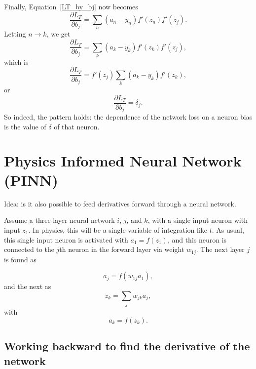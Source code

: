 \documentclass[12pt]{article}
\begin{document}
Finally, Equation~\ref{LT_by_bj} now becomes
\begin{equation}
\frac{\partial L_T}{\partial b_j}=\sum_n (a_n-y_n)f'(z_n)f'(z_j).
\end{equation}
Letting $n\rightarrow k$, we get
\begin{equation}
\frac{\partial L_T}{\partial b_j}=\sum_k (a_k-y_k)f'(z_k)f'(z_j),
\end{equation}
which is 
\begin{equation}
\frac{\partial L_T}{\partial b_j}=f'(z_j)\sum_k (a_k-y_k)f'(z_k),
\end{equation}
or 
\begin{equation}
\frac{\partial L_T}{\partial b_j}=\delta_j.
\end{equation}
So indeed, the pattern holds: the dependence of the network loss on a neuron bias is the value of $\delta$ of that  neuron. 


\section{Physics Informed Neural Network (PINN)}

Idea: is it also possible to feed derivatives forward through a neural network.

Assume a three-layer neural network $i$, $j$, and $k$, with a single input neuron with input $z_1$. In physics, this will be a single variable of integration like $t$. As usual, this single input neuron is activated with $a_1=f(z_1)$, and this neuron is connected to the $j$th neuron in the forward layer via weight $w_{1j}$.  The next layer $j$ is found as

\begin{equation}
a_j=f\left(w_{1j} a_1\right),
\end{equation}
and the next as 
\begin{equation}
z_k=\sum_j w_{jk} a_j,
\end{equation}
with
\begin{equation}
a_k=f(z_k).
\end{equation}

\subsection{Working backward to find the derivative of the network}
\label{dforward}
\end{document}
